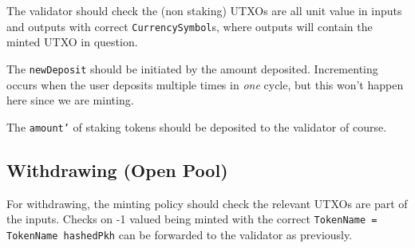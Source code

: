 \documentclass[10pt, a4paper]{article}
\theoremstyle{definition}
\begin{document}
\begin{enumerate}
{The validator should check the (non staking) UTXOs are all unit value in inputs and outputs with correct \texttt{CurrencySymbol}s, where outputs will contain the minted UTXO in question.

The \texttt{newDeposit} should be initiated by the amount deposited. Incrementing occurs when the user deposits multiple times in \textit{one} cycle, but this won't happen here since we are minting.

The \texttt{amount'} of staking tokens should be deposited to the validator of course.
}
\end{enumerate}

\subsection{Withdrawing (\textbf{Open Pool})}\label{subsection:WithdrawingOpen}
For withdrawing, the minting policy should check the relevant UTXOs are part of the inputs. Checks on -1 valued being minted with the correct \texttt{TokenName = TokenName hashedPkh} can be forwarded to the validator as previously.
\end{document}
